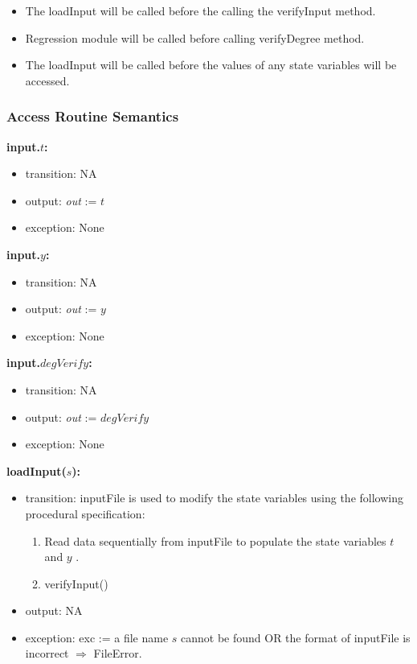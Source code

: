 \documentclass[12pt, titlepage]{article}
\begin{document}
\begin{itemize}
	
	\item The loadInput will be called before the calling the verifyInput 
	method.
	\item Regression module will be called before calling verifyDegree method.
	\item The loadInput will be called before the values of any state variables 
	will be accessed.
	
\end{itemize}
\subsubsection{Access Routine Semantics}


\noindent \textbf{input.$t$:}
\begin{itemize}
	\item transition: NA 	
	\item output: \textit{out} := $t$
	\item exception: None
\end{itemize}

\noindent \textbf{input.$y$:}
\begin{itemize}
	\item transition: NA 	
	\item output: \textit{out} := $y$
	\item exception: None
\end{itemize}

\noindent \textbf{input.$degVerify$:}
\begin{itemize}
	\item transition: NA 	
	\item output: \textit{out} := $degVerify$
	\item exception: None
\end{itemize}

\noindent \textbf{loadInput($s$):}
\begin{itemize}
	\item transition: {inputFile} is used to modify the state variables using 
	the following procedural specification:
	
	\begin{enumerate}
		
		\item Read data sequentially from inputFile to populate the state 
		variables $t$ and $y$ .
		
		\item verifyInput()
		
	\end{enumerate}
	\item output: NA
	\item exception: exc := a file name $s$ cannot be found OR the format of
	inputFile is incorrect $\Rightarrow$ FileError.
	
\end{itemize}
\end{document}
